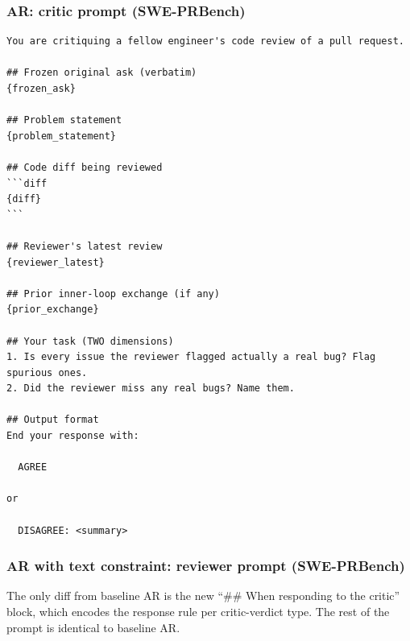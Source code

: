 \documentclass{article}
\begin{document}
\subsubsection{AR: critic prompt (SWE-PRBench)}
\label{app:prompts-prbench-v1-c}

\begin{footnotesize}
\begin{verbatim}
You are critiquing a fellow engineer's code review of a pull request.

## Frozen original ask (verbatim)
{frozen_ask}

## Problem statement
{problem_statement}

## Code diff being reviewed
```diff
{diff}
```

## Reviewer's latest review
{reviewer_latest}

## Prior inner-loop exchange (if any)
{prior_exchange}

## Your task (TWO dimensions)
1. Is every issue the reviewer flagged actually a real bug? Flag spurious ones.
2. Did the reviewer miss any real bugs? Name them.

## Output format
End your response with:

  AGREE

or

  DISAGREE: <summary>
\end{verbatim}
\end{footnotesize}

\subsubsection{AR with text constraint: reviewer prompt (SWE-PRBench)}
\label{app:prompts-prbench-v2-r}

The only diff from baseline AR is the new ``\#\# When responding to the critic''
block, which encodes the response rule per critic-verdict type. The
rest of the prompt is identical to baseline AR.
\end{document}

